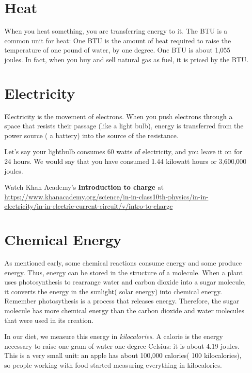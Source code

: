 \section{Heat}

When you heat something, you are transferring energy to it. The BTU
 is a common unit for heat: One BTU is the
amount of heat required to raise the temperature of one pound of water,
by one degree. One BTU is about 1,055 joules. In fact, when you buy and sell
natural gas as fuel, it is priced by the BTU. 

\section{Electricity}

Electricity is the movement of electrons. When you push electrons
through a space that resists their passage (like a light bulb),
energy is transferred from the power source ( a battery)
 into the source of the resistance.

Let's say your lightbulb consumes 60 watts of electricity, and you leave it on for 24 hours.
We would say that you have consumed 1.44 kilowatt hours or 3,600,000 joules.

Watch Khan Academy's \textbf{Introduction to charge} at \url{https://www.khanacademy.org/science/in-in-class10th-physics/in-in-electricity/in-in-electric-current-circuit/v/intro-to-charge}

\section{Chemical Energy}

As mentioned early, some chemical reactions consume energy and some
produce energy. Thus, energy can be stored in the structure of a
molecule. When a plant uses photosynthesis to rearrange water and
carbon dioxide into a sugar molecule, it converts the energy in
the sunlight( solar energy) into chemical energy. Remember photosythesis is a process that releases energy.
Therefore, the sugar molecule has more chemical energy than the carbon dioxide and water molecules that were
used in its creation.

In our diet, we measure this energy in \textit{kilocalories}. A
calorie is the energy necessary to raise one gram of water one degree
Celsius: it is about 4.19 joules. This is a very small unit: an apple
has about 100,000 calories( 100 kilocalories), so people working with food started
measuring everything in kilocalories.

